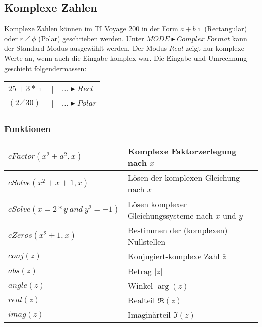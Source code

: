 \subsection{Komplexe Zahlen}

Komplexe Zahlen können im TI Voyage 200 in der Form $a+b\imath$ (Rectangular) oder 
$r \: \angle \: \phi$ (Polar) geschrieben werden. Unter 
$MODE \blacktriangleright Complex \ Format$ kann der Standard-Modus ausgewählt werden.
Der Modus $Real$ zeigt nur komplexe Werte an, wenn auch die Eingabe komplex war.
Die Eingabe und Umrechnung geschieht folgendermassen: \\
\begin{tabular}{l l l}
	$2 5+3*\imath$			& | & $... \blacktriangleright Rect$	\\
	$(2 \angle 30) $		& | & $... \blacktriangleright Polar$	\\
\end{tabular}

\subsubsection{Funktionen}
\begin{tabular}{|l|l|}
	\hline
	$cFactor(x^2+a^2,x)$								& Komplexe Faktorzerlegung nach $x$						\\ \hline
	$cSolve(x^2+x+1,x)$									& Lösen der komplexen Gleichung nach $x$				\\
	$cSolve(x=2*y \: and \: y^2=-1)$					& Lösen komplexer Gleichungssysteme nach $x$ und $y$	\\ \hline
	$cZeros(x^2+1,x)$									& Bestimmen der (komplexen) Nullstellen					\\ \hline
	$conj(z)$											& Konjugiert-komplexe Zahl $\bar{z}$					\\ \hline
	$abs(z)$											& Betrag $|z|$											\\ \hline
	$angle(z)$											& Winkel $\arg(z)$										\\ \hline
	$real(z)$											& Realteil $\Re(z)$										\\ \hline
	$imag(z)$											& Imaginärteil $\Im(z)$									\\ \hline
\end{tabular}

